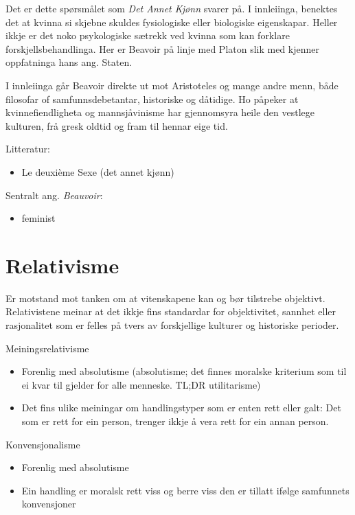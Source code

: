 \documentclass[a4paper]{IEEEtran}
\begin{document}
Det er dette spørsmålet som \textit{Det Annet Kjønn} svarer på. I innleiinga, benektes det at kvinna si skjebne skuldes fysiologiske eller biologiske eigenskapar. Heller ikkje er det noko psykologiske sætrekk ved kvinna som kan forklare forskjellsbehandlinga. Her er Beavoir på linje med Platon slik med kjenner oppfatninga hans ang. Staten.\bigskip

I innleiinga går Beavoir direkte ut mot Aristoteles og mange andre menn, både filosofar of samfunnsdebetantar, historiske og dåtidige. Ho påpeker at kvinnefiendligheta og mannsjåvinisme har gjennomsyra heile den vestlege kulturen, frå gresk oldtid og fram til hennar eige tid.\bigskip

\begin{center}
Litteratur:
\end{center}
\begin{itemize}
    \item Le deuxième Sexe (det annet kjønn)
\end{itemize}\bigskip 

\begin{center}
Sentralt ang. \textit{Beauvoir}:
\end{center}
\begin{itemize}\bigskip
     \item feminist
\end{itemize}\bigskip

\bigskip
\section{Relativisme}
\label{relativisme}
Er motstand mot tanken om at vitenskapene kan og bør tilstrebe objektivt. Relativistene meinar at det ikkje fins standardar for objektivitet, sannhet eller rasjonalitet som er felles på tvers av forskjellige kulturer og historiske perioder.
\bigskip

Meiningsrelativisme\bigskip
\begin{itemize}
    \item Forenlig med absolutisme (absolutisme; det finnes moralske kriterium som til ei kvar til gjelder for alle menneske. TL;DR utilitarisme)
    \item Det fins ulike meiningar om handlingstyper som er enten rett eller galt: Det som er rett for ein person, trenger ikkje å vera rett for ein annan person.
\end{itemize}\bigskip

Konvensjonalisme\bigskip
\begin{itemize}
    \item Forenlig med absolutisme
    \item Ein handling er moralsk rett viss og berre viss den er tillatt ifølge samfunnets konvensjoner
\end{itemize}\bigskip
\end{document}
